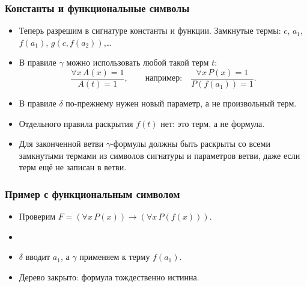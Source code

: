 \documentclass[10pt]{beamer}
\begin{document}
\begin{frame}
\frametitle{Константы и функциональные символы}
\begin{itemize}
    \item Теперь разрешим в сигнатуре константы и функции. Замкнутые термы: $c$, $a_1$, $f(a_1)$, $g(c,f(a_2))$,\ldots
    \item В правиле $\gamma$ можно использовать любой такой терм $t$:
    \[
        \dfrac{\forall x\,A(x)=1}{A(t)=1},
        \qquad\text{например:}\quad
        \dfrac{\forall x\,P(x)=1}{P(f(a_1))=1}.
    \]
    \pause
    \item В правиле $\delta$ по-прежнему нужен новый параметр, а не произвольный терм.
    \item Отдельного правила раскрытия $f(t)$ нет: это терм, а не формула.
    \pause
    \item Для законченной ветви $\gamma$-формулы должны быть раскрыты со всеми замкнутыми термами из символов сигнатуры и параметров ветви, даже если терм ещё не записан в ветви.
\end{itemize}
\end{frame}

\begin{frame}
\frametitle{Пример с функциональным символом}
\begin{itemize}
    \item Проверим $F=(\forall x\,P(x))\to(\forall x\,P(f(x)))$.
    \item[]
    \item<2-> $\delta$ вводит $a_1$, а $\gamma$ применяем к терму $f(a_1)$.
    \item<3-> Дерево закрыто: формула тождественно истинна.
\end{itemize}
\end{frame}
\end{document}
